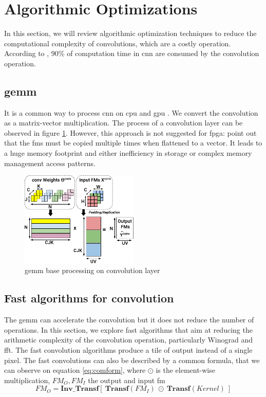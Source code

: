 \section{Algorithmic Optimizations} \label{sec:algopti}
In this section, we will review algorithmic optimization techniques to reduce the computational complexity of convolutions, which are a costly operation. According to \cite{shawahna_fpga-based_2019}, 90\% of computation time in \acrshort{cnn} are consumed by the convolution operation.
%
%
\subsection{\acrfull{gemm}}
%
%
It is a common way to process \acrshort{cnn} on \acrshort{cpu} and \acrshort{gpu} \cite{abdelouahab_accelerating_2018}. We convert the convolution as a matrix-vector multiplication. The process of a convolution layer can be observed in figure \ref{fig:gemm}. However, this approach is not suggested for \acrshort{fpga}: \textcite{sze_efficient_2017, zhu_efficient_2020} point out that the \acrshort{fm}s must be copied multiple times when flattened to a vector. It leads to a huge memory footprint and either inefficiency in storage or complex memory management access patterns.
\begin{figure}
    \centering
    \includegraphics[width=0.5\textwidth]{Images/gemm.pdf}
    \caption{\acrshort{gemm} base processing on convolution layer \cite{abdelouahab_accelerating_2018}}
    \label{fig:gemm}
\end{figure}
%
%
\subsection{Fast algorithms for convolution}
The \acrshort{gemm} can accelerate the convolution but it does not reduce the number of operations. In this section, we explore fast algorithms that aim at reducing the arithmetic complexity of the convolution operation, particularly Winograd and \acrfull{fft}. The fast convolution algorithms produce a tile of output instead of a single pixel. The fast convolutions can also be described by a common formula, that we can observe on equation \ref{eq:comform}, where $\odot$ is the element-wise multiplication, $FM_O, FM_I$ the output and input \acrshort{fm}
\begin{equation}
FM_O = \boldsymbol{Inv\_Transf} [ \ \boldsymbol{Transf}(FM_I) \ \odot \ \boldsymbol{Transf}(Kernel) \ ]
\label{eq:comform}
\end{equation}
%
